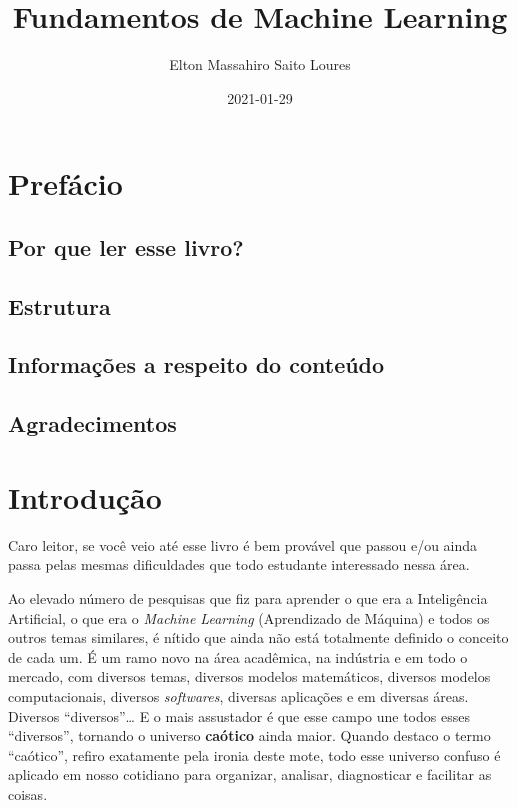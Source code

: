 \documentclass[
]{book}
\title{Fundamentos de Machine Learning}
\author{Elton Massahiro Saito Loures}
\date{2021-01-29}
\begin{document}
\maketitle

{
\setcounter{tocdepth}{1}
\tableofcontents
}
\hypertarget{prefuxe1cio}{%
\chapter*{Prefácio}\label{prefuxe1cio}}

\hypertarget{por-que-ler-esse-livro}{%
\section{Por que ler esse livro?}\label{por-que-ler-esse-livro}}

\hypertarget{estrutura}{%
\section{Estrutura}\label{estrutura}}

\hypertarget{informauxe7uxf5es-a-respeito-do-conteuxfado}{%
\section{Informações a respeito do conteúdo}\label{informauxe7uxf5es-a-respeito-do-conteuxfado}}

\hypertarget{agradecimentos}{%
\section{Agradecimentos}\label{agradecimentos}}

\hypertarget{intro}{%
\chapter{Introdução}\label{intro}}

Caro leitor, se você veio até esse livro é bem provável que passou e/ou ainda passa pelas mesmas dificuldades que todo estudante interessado nessa área.

Ao elevado número de pesquisas que fiz para aprender o que era a Inteligência Artificial, o que era o \emph{Machine Learning} (Aprendizado de Máquina) e todos os outros temas similares, é nítido que ainda não está totalmente definido o conceito de cada um. É um ramo novo na área acadêmica, na indústria e em todo o mercado, com diversos temas, diversos modelos matemáticos, diversos modelos computacionais, diversos \emph{softwares}, diversas aplicações e em diversas áreas. Diversos ``diversos''\ldots{} E o mais assustador é que esse campo une todos esses ``diversos'', tornando o universo \textbf{caótico} ainda maior. Quando destaco o termo ``caótico'', refiro exatamente pela ironia deste mote, todo esse universo confuso é aplicado em nosso cotidiano para organizar, analisar, diagnosticar e facilitar as coisas.
\end{document}
